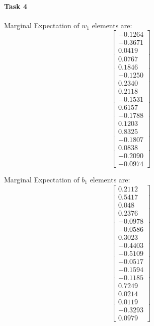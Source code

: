 \documentclass{article}
\begin{document}
\paragraph{Task 4}
Marginal Expectation of $w_1$ elements are:
\[
\begin{bmatrix}
-0.1264 \\ -0.3671 \\ 0.0419 \\ 0.0767 \\ 0.1846 \\ -0.1250 \\ 0.2340 \\ 0.2118 \\ -0.1531 \\ 0.6157 \\ -0.1788 \\ 0.1203 \\ 0.8325 \\ -0.1807 \\ 0.0838 \\ -0.2090 \\ -0.0974
\end{bmatrix}
\]

Marginal Expectation of $b_1$ elements are:
\[
\begin{bmatrix}
0.2112 \\ 0.5417 \\ 0.048 \\ 0.2376 \\ -0.0978 \\ -0.0586 \\ 0.3023 \\ -0.4403 \\ -0.5109 \\
-0.0517\\
-0.1594\\
-0.1185\\
0.7249\\
0.0214\\
0.0119\\
-0.3293\\
0.0979
\end{bmatrix}
\]
\end{document}

